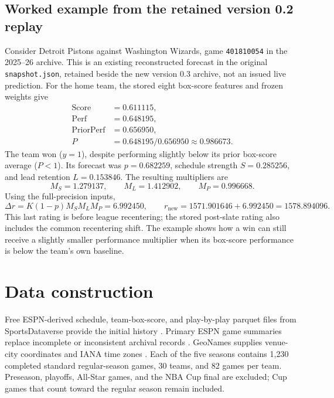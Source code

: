 \documentclass[11pt]{article}
\begin{document}
\begin{minipage}{\textwidth}
\subsection{Worked example from the retained version 0.2 replay}
Consider Detroit Pistons against Washington Wizards, game
\texttt{401810054} in the 2025--26 archive. This is an existing
reconstructed forecast in the original \texttt{snapshot.json}, retained
beside the new version 0.3 archive, not an issued live prediction. For the
home team, the stored eight box-score features and frozen weights give
\begin{align*}
 \mathrm{Score}&=0.611115,\\
 \mathrm{Perf}&=0.648195,\\
 \mathrm{PriorPerf}&=0.656950,\\
 P&=0.648195/0.656950\approx 0.986673.
\end{align*}
The team won ($y=1$), despite performing slightly below its prior box-score
average ($P<1$). Its forecast was $p=0.682259$, schedule strength
$S=0.285256$, and lead retention $L=0.153846$. The resulting multipliers are
\begin{equation*}
 M_S=1.279137,\qquad M_L=1.412902,\qquad M_P=0.996668.
\end{equation*}
Using the full-precision inputs,
\begin{equation*}
 \Delta r=K(1-p)M_SM_LM_P=6.992450,\qquad
 r_{\mathrm{new}}=1571.901646+6.992450=1578.894096.
\end{equation*}
This last rating is before league recentering; the stored post-slate rating
also includes the common recentering shift. The example shows how a win can
still receive a slightly smaller performance multiplier when its box-score
performance is below the team's own baseline.
\end{minipage}

\section{Data construction}
Free ESPN-derived schedule, team-box-score, and play-by-play parquet files from
SportsDataverse provide the initial history \cite{sportsdataverse}. Primary
ESPN game summaries replace incomplete or inconsistent archival records
\cite{espn}. GeoNames supplies venue-city coordinates and IANA time zones
\cite{geonames}. Each of the five seasons contains 1,230 completed standard
regular-season games, 30 teams, and 82 games per team. Preseason, playoffs,
All-Star games, and the NBA Cup final are excluded; Cup games that count
toward the regular season remain included.
\end{document}
